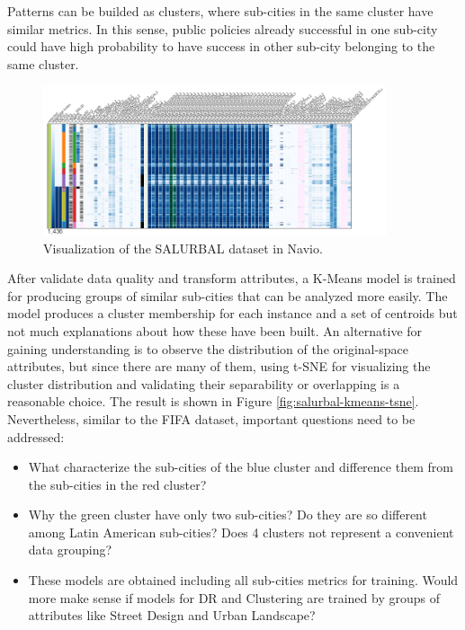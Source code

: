 Patterns can be builded as clusters, where sub-cities in the same cluster have similar metrics. In this sense, public policies already successful in one sub-city could have high probability to have success in other sub-city belonging to the same cluster. 

\begin{figure}[ht]
 \centering
 \includegraphics[width=0.9\textwidth]{salurbal-navio.png}
 \caption{Visualization of the SALURBAL dataset in Navio.}
 \label{fig:salurbal-navio}
\end{figure}

After validate data quality and transform attributes, a K-Means model is trained for producing groups of similar sub-cities that can be analyzed more easily. The model produces a cluster membership for each instance and a set of centroids but not much explanations about how these have been built. An alternative for gaining understanding is to observe the distribution of the original-space attributes, but since there are many of them, using t-SNE for visualizing the cluster distribution and validating their separability or overlapping is a reasonable choice. The result is shown in Figure \ref{fig:salurbal-kmeans-tsne}. Nevertheless, similar to the FIFA dataset, important questions need to be addressed: 

\begin{itemize}
\item What characterize the sub-cities of the blue cluster and difference them from the sub-cities in the red cluster?
\item Why the green cluster have only two sub-cities? Do they are so different among Latin American sub-cities? Does 4 clusters not represent a convenient data grouping?
\item These models are obtained including all sub-cities metrics for training. Would more make sense if models for DR and Clustering are trained by groups of attributes like Street Design and Urban Landscape?
\end{itemize}

